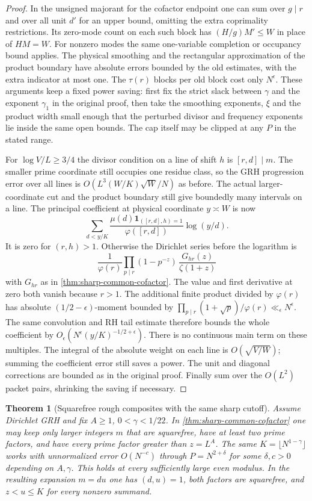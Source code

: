 \documentclass[11pt,a4paper]{article}
\numberwithin{equation}{section}
\newtheorem{theorem}{Theorem}[section]
\begin{document}
\begin{proof}
In the unsigned majorant for the cofactor endpoint one can sum
over $g\mid r$ and over all unit $d'$ for an upper bound,
omitting the extra coprimality restrictions. Its zero-mode count
on each such block has $(H/g)M'\le W$ in place of $HM=W$.
For nonzero modes the same one-variable completion or occupancy
bound applies. The physical smoothing and the rectangular
approximation of the product boundary have absolute errors
bounded by the old estimates, with the extra indicator at most
one. The $\tau(r)$ blocks per old block cost only $N^\epsilon$.
These arguments keep a fixed power saving: first fix the strict
slack between $\gamma$ and the exponent $\gamma_1$ in the
original proof, then take the smoothing exponents, $\xi$ and
the product width small enough that the perturbed divisor and
frequency exponents lie inside the same open bounds. The cap
itself may be clipped at any $P$ in the stated range.

For $\log V/L\ge3/4$ the divisor condition on a line of shift
$h$ is $[r,d]\mid m$. The smaller prime coordinate still occupies
one residue class, so the GRH progression error over all lines
is $O(L^3(W/K)\sqrt W/N)$ as before. The actual larger-coordinate
cut and the product boundary still give boundedly many intervals
on a line. The principal coefficient at physical coordinate
$y\asymp W$ is now
\[
 \sum_{d<y/K}
   \frac{\mu(d)\mathbf1_{([r,d],h)=1}}{\varphi([r,d])}\log(y/d).
\]
It is zero for $(r,h)>1$. Otherwise the Dirichlet series before
the logarithm is
\[
 \frac{1}{\varphi(r)}
 \prod_{p\mid r}(1-p^{-z})\,\frac{G_{hr}(z)}{\zeta(1+z)}
\]
with $G_{hr}$ as in \cref{thm:sharp-common-cofactor}. The value
and first derivative at zero both vanish because $r>1$.
The additional finite product divided by $\varphi(r)$ has
absolute $(1/2-\epsilon)$-moment bounded by
$\prod_{p\mid r}(1+\sqrt p)/\varphi(r)\ll_\epsilon N^\epsilon$.
The same convolution and RH tail estimate therefore bounds the
whole coefficient by $O_\epsilon(N^\epsilon(y/K)^{-1/2+\epsilon})$.
There is no continuous main term on these multiples. The integral
of the absolute weight on each line is $O(\sqrt{V/W})$;
summing the coefficient error still saves a power. The unit
and diagonal corrections are bounded as in the original proof.
Finally sum over the $O(L^2)$ packet pairs, shrinking the
saving if necessary.
\end{proof}

\begin{theorem}[Squarefree rough composites with the same sharp cutoff]
\label{thm:common-cofactor-sifted}
Assume Dirichlet GRH and fix $A\ge1$, $0<\gamma<1/22$.
In \cref{thm:sharp-common-cofactor} one may keep only larger
integers $m$ that are squarefree, have at least two prime factors,
and have every prime factor greater than $z=L^A$. The same
$K=\lfloor N^{1-\gamma}\rfloor$ works with unnormalized error
$O(N^{-c})$ through $P=N^{2+\delta}$ for some $\delta,c>0$
depending on $A,\gamma$. This holds at every sufficiently large
even modulus. In the resulting expansion $m=du$ one has
$(d,u)=1$, both factors are squarefree, and $z<u\le K$ for
every nonzero summand.
\end{theorem}
\end{document}
